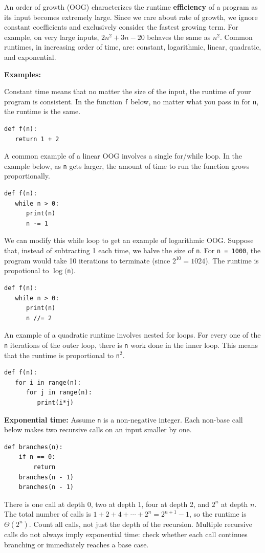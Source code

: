 An order of growth (OOG) characterizes the runtime \textbf{efficiency} of a program as its input becomes extremely large. Since we care about rate of growth, we ignore constant coefficients and exclusively consider the fastest growing term. For example, on very large inputs, $2n^2 + 3n - 20$ behaves the same as $n^2$. Common runtimes, in increasing order of time, are: constant, logarithmic, linear, quadratic, and exponential.

\textbf{Examples:}

Constant time means that no matter the size of the input, the runtime of your program is consistent. In the function \lstinline{f} below, no matter what you pass in for \lstinline{n}, the runtime is the same. \\
\begin{lstlisting}
def f(n):
   return 1 + 2
\end{lstlisting}
A common example of a linear OOG involves a single for/while loop. In the example below, as \lstinline{n} gets larger, the amount of time to run the function grows proportionally. \\
\begin{lstlisting}
def f(n):
   while n > 0:
      print(n)
      n -= 1
\end{lstlisting}
We can modify this while loop to get an example of logarithmic OOG. Suppose that, instead of subtracting 1 each time, we halve the size of \lstinline{n}. For \lstinline{n = 1000}, the program would take 10 iterations to terminate (since $2^{10} = 1024$). The runtime is propotional to $\log($\lstinline{n}$)$.
\begin{lstlisting}
def f(n):
   while n > 0:
      print(n)
      n //= 2
\end{lstlisting}
An example of a quadratic runtime involves nested for loops. For every one of the \lstinline{n} iterations of the outer loop, there is \lstinline{n} work done in the inner loop. This means that the runtime is proportional to \lstinline{n}$^{2}$. 
\begin{lstlisting}
def f(n):
   for i in range(n):
      for j in range(n):
         print(i*j)
\end{lstlisting}

\textbf{Exponential time:} Assume \lstinline{n} is a non-negative integer.
Each non-base call below makes two recursive calls on an input smaller by one.
\begin{lstlisting}
def branches(n):
    if n == 0:
        return
    branches(n - 1)
    branches(n - 1)
\end{lstlisting}
There is one call at depth 0, two at depth 1, four at depth 2, and
$2^n$ at depth $n$. The total number of calls is
$1 + 2 + 4 + \cdots + 2^n = 2^{n+1} - 1$, so the runtime is
$\Theta(2^n)$. Count all calls, not just the depth of the recursion.
Multiple recursive calls do not always imply exponential time: check whether
each call continues branching or immediately reaches a base case.

